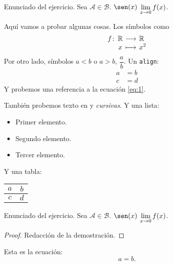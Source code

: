 \documentclass[a4,10pt]{aleph-notas}
\newcommand{\A}{\mathcal{A}}
\newcommand{\B}{\mathcal{B}}
\begin{document}
\encabezado


\begin{ejer}
    Enunciado del ejercicio. Sea $\A \in \B$. $\sen(x)$ $\displaystyle\lim_{x\to 0} f(x)$.
\end{ejer}


Aquí vamos a probar algunas cosas. Los símbolos como 
\[
    \funcion{f}{\R}{\R}{x}{x^2}
\]
Por otro lado, símbolos $a<b$ o $a>b$, $\dfrac{a}{b}$. Un \texttt{align}:
\begin{align*}
    a &= b\\
    c &= d
\end{align*}
Y probemos una referencia a la ecuación \eqref{eq:1}.

También probemos texto en  y \textit{cursivas}. Y una lista:
\begin{itemize}
    \item Primer elemento.
    \item Segundo elemento.
    \item Tercer elemento.
\end{itemize}
Y una tabla:
\begin{center}
    \begin{tabular}[h]{|c|c|}
        \hline
        $a$ & $b$\\
        \hline
        $c$ & $d$\\
        \hline
    \end{tabular}
\end{center}



\begin{ejer}
    Enunciado del ejercicio. Sea $\A \in \B$. $\sen(x)$ $\displaystyle\lim_{x\to 0} f(x)$.
\end{ejer}

\begin{proof}
    Redacción de la demostración.\qedhere
\end{proof}

Esta es la ecuación:
\begin{equation}
    a = b.
    \label{eq:1}
\end{equation}
\end{document}
